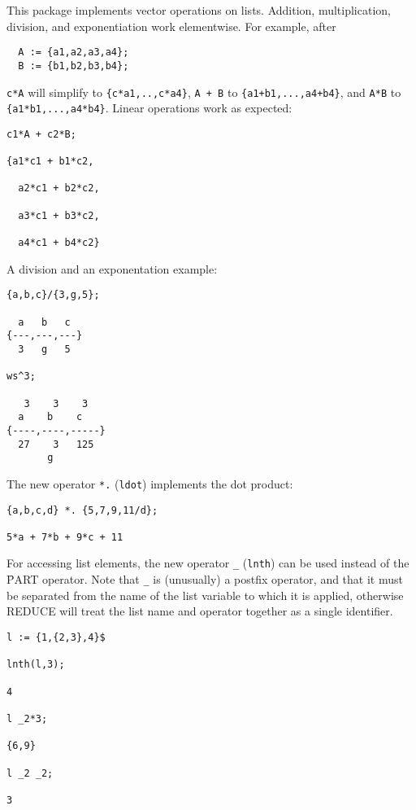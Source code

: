 

This package implements vector operations on lists.
Addition, multiplication, division, and exponentiation work elementwise.
For example, after
\begin{verbatim}
  A := {a1,a2,a3,a4};
  B := {b1,b2,b3,b4};
\end{verbatim}
\texttt{c*A} will simplify to \texttt{\{c*a1,..,c*a4\}},
\texttt{A + B} to \texttt{\{a1+b1,...,a4+b4\}}, and
\texttt{A*B} to \texttt{\{a1*b1,...,a4*b4\}}.
Linear operations work as expected:
\begin{verbatim}
c1*A + c2*B;

{a1*c1 + b1*c2,

  a2*c1 + b2*c2,

  a3*c1 + b3*c2,

  a4*c1 + b4*c2}
\end{verbatim}
A division and an exponentation example:
\begin{verbatim}
{a,b,c}/{3,g,5};

  a   b   c
{---,---,---}
  3   g   5

ws^3;

   3    3    3
  a    b    c
{----,----,-----}
  27    3   125
       g
\end{verbatim}
The new operator \texttt{*.} (\texttt{ldot})
 implements
the dot product:
\begin{verbatim}
{a,b,c,d} *. {5,7,9,11/d};

5*a + 7*b + 9*c + 11
\end{verbatim}
For accessing list elements, the new operator \texttt{\_} (\texttt{lnth})
can be used instead of the \f{PART} operator.
Note that \texttt{\_} is (unusually) a postfix operator, and that it
must be separated from the name of the list variable to which it is
applied, otherwise REDUCE will treat the list name and operator
together as a single identifier.
\begin{verbatim}
l := {1,{2,3},4}$

lnth(l,3);

4

l _2*3;

{6,9}

l _2 _2;

3
\end{verbatim}
